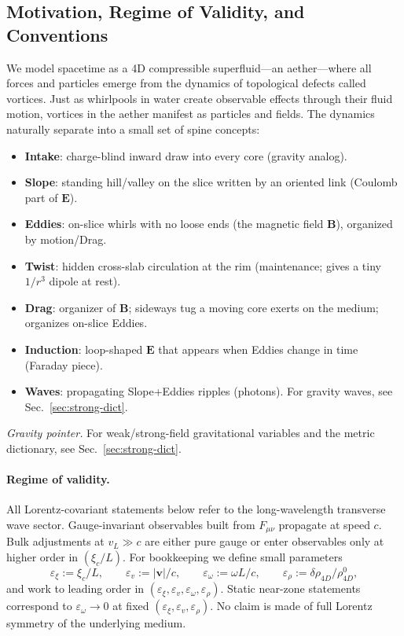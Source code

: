\subsection{Motivation, Regime of Validity, and Conventions}
\label{sec:motivation-conventions}

We model spacetime as a 4D compressible superfluid---an aether---where all forces and particles emerge from the dynamics of topological defects called vortices. Just as whirlpools in water create observable effects through their fluid motion, vortices in the aether manifest as particles and fields. The dynamics naturally separate into a small set of spine concepts:
\begin{itemize}
  \item \textbf{Intake}: charge-blind inward draw into every core (gravity analog).
  \item \textbf{Slope}: standing hill/valley on the slice written by an oriented link (Coulomb part of $\mathbf E$).
  \item \textbf{Eddies}: on-slice whirls with no loose ends (the magnetic field $\mathbf B$), organized by motion/Drag.
  \item \textbf{Twist}: hidden cross-slab circulation at the rim (maintenance; gives a tiny $1/r^3$ dipole at rest).
  \item \textbf{Drag}: organizer of $\mathbf B$; sideways tug a moving core exerts on the medium; organizes on-slice Eddies.
  \item \textbf{Induction}: loop-shaped $\mathbf E$ that appears when Eddies change in time (Faraday piece).
  \item \textbf{Waves}: propagating Slope+Eddies ripples (photons). For gravity waves, see Sec.~\ref{sec:strong-dict}.
\end{itemize}
\noindent\emph{Gravity pointer.} For weak/strong-field gravitational variables and the metric dictionary, see Sec.~\ref{sec:strong-dict}.
\paragraph{Regime of validity.} All Lorentz-covariant statements below refer to the long-wavelength transverse wave sector. Gauge-invariant observables built from $F_{\mu\nu}$ propagate at speed $c$. Bulk adjustments at $v_L\gg c$ are either pure gauge or enter observables only at higher order in $(\xi_c/L)$. For bookkeeping we define small parameters
\[
\varepsilon_\xi:=\xi_c/L,\qquad
\varepsilon_v:=|\mathbf v|/c,\qquad
\varepsilon_\omega:=\omega L/c,\qquad
\varepsilon_\rho:=\delta\rho_{4D}/\rho_{4D}^0,
\]
and work to leading order in $(\varepsilon_\xi,\varepsilon_v,\varepsilon_\omega,\varepsilon_\rho)$. Static near-zone statements correspond to $\varepsilon_\omega\to0$ at fixed $(\varepsilon_\xi,\varepsilon_v,\varepsilon_\rho)$. No claim is made of full Lorentz symmetry of the underlying medium.

